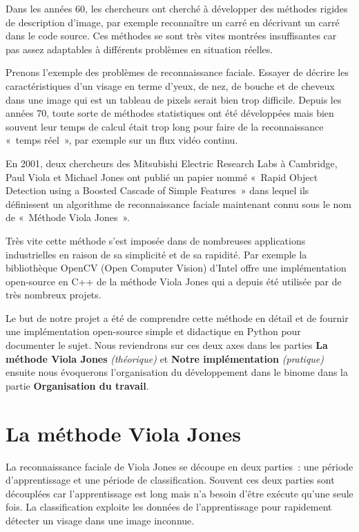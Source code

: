 \documentclass[a4paper,11pt]{report}
\begin{document}
	Dans les années 60, les chercheurs ont cherché à développer des méthodes rigides de description d’image, par exemple reconnaître un carré en décrivant un carré dans le code source. Ces méthodes se sont très vites montrées insuffisantes car pas assez adaptables à différents problèmes en situation réelles.

	Prenons l’exemple des problèmes de reconnaissance faciale. Essayer de décrire les caractéristiques d’un visage en terme d’yeux, de nez, de bouche et de cheveux dans une image qui est un tableau de pixels serait bien trop difficile. Depuis les années 70, toute sorte de méthodes statistiques ont été développées mais bien souvent leur temps de calcul était trop long pour faire de la reconnaissance « temps réel », par exemple sur un flux vidéo continu.

	En 2001, deux chercheurs des Mitsubishi Electric Research Labs à Cambridge, Paul Viola et Michael Jones ont publié un papier nommé « Rapid Object Detection using a Boosted Cascade of Simple Features » dans lequel ils définissent un algorithme de reconnaissance faciale maintenant connu sous le nom de « Méthode Viola Jones ».

	Très vite cette méthode s’est imposée dans de nombreuses applications industrielles en raison de sa simplicité et de sa rapidité. Par exemple la bibliothèque OpenCV (Open Computer Vision) d’Intel offre une implémentation open-source en C++ de la méthode Viola Jones qui a depuis été utilisée par de très nombreux projets.

	Le but de notre projet a été de comprendre cette méthode en détail et de fournir une implémentation open-source simple et didactique en Python pour documenter le sujet. Nous reviendrons sur ces deux axes dans les parties \textbf{La méthode Viola Jones} \textit{(théorique)} et \textbf{Notre implémentation} \textit{(pratique)} ensuite nous évoquerons l’organisation du développement dans le binome dans la partie \textbf{Organisation du travail}.

\chapter{La méthode Viola Jones}
	La reconnaissance faciale de Viola Jones se découpe en deux parties : une période d’apprentissage et une période de classification. Souvent ces deux parties sont découplées car l’apprentissage est long mais n’a besoin d’être exécute qu’une seule fois. La classification exploite les données de l’apprentissage pour rapidement détecter un visage dans une image inconnue.
\end{document}
